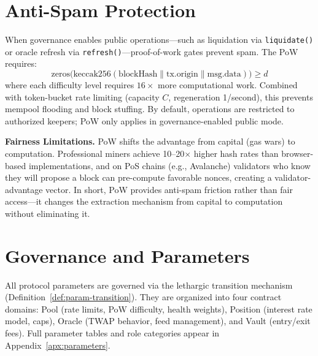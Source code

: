 \documentclass[10pt,a4paper,twocolumn]{article}
\begin{document}
\section{Anti-Spam Protection}
\label{sec:antispam}

When governance enables public operations---such as liquidation via \texttt{liquidate()} or oracle refresh via \texttt{refresh()}---proof-of-work gates prevent spam. The PoW requires:
\begin{equation}
\text{zeros}\bigl(\text{keccak256}(\text{blockHash} \| \text{tx.origin} \| \text{msg.data})\bigr) \geq d
\end{equation}
where each difficulty level requires $16\times$ more computational work. Combined with token-bucket rate limiting (capacity $C$, regeneration 1/second), this prevents mempool flooding and block stuffing. By default, operations are restricted to authorized keepers; PoW only applies in governance-enabled public mode.

\textbf{Fairness Limitations.} PoW shifts the advantage from capital (gas wars) to computation. Professional miners achieve 10--20$\times$ higher hash rates than browser-based implementations, and on PoS chains (e.g., Avalanche) validators who know they will propose a block can pre-compute favorable nonces, creating a validator-advantage vector. In short, PoW provides anti-spam friction rather than fair access---it changes the extraction mechanism from capital to computation without eliminating it.

\section{Governance and Parameters}
\label{sec:governance}

All protocol parameters are governed via the lethargic transition mechanism (Definition~\ref{def:param-transition}). They are organized into four contract domains: Pool (rate limits, PoW difficulty, health weights), Position (interest rate model, caps), Oracle (TWAP behavior, feed management), and Vault (entry/exit fees). Full parameter tables and role categories appear in Appendix~\ref{apx:parameters}.
\end{document}

